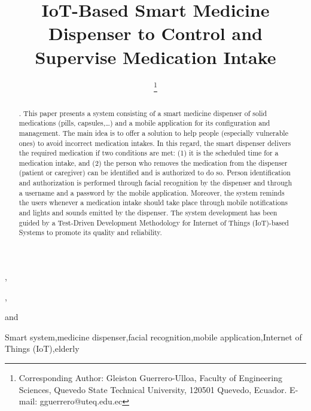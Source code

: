 \documentclass{IOS-Book-Article}
\begin{document}
\pagestyle{headings}
\def\thepage{}


\begin{frontmatter}              %


\title{IoT-Based Smart Medicine Dispenser to Control and Supervise Medication Intake\\}

\markboth{}{}

\author[A]{ %
\thanks{Corresponding Author: Gleiston Guerrero-Ulloa, Faculty of Engineering Sciences, Quevedo State Technical University, 120501 Quevedo, Ecuador. E-mail: gguerrero@uteq.edu.ec}},
\author[B]{ }
,
\author[B]{ }
and
\author[A]{ }

\address[A]{Faculty of Engineering Sciences, Quevedo State Technical University, Ecuador}
\address[B]{Software Engineering Department, University of Granada, Spain}

\begin{abstract}. This paper presents a system consisting of a smart medicine dispenser of solid medications (pills, capsules,…) and a mobile application for its configuration and management. The main idea is to offer a solution to help people (especially vulnerable ones) to avoid incorrect medication intakes. In this regard, the smart dispenser delivers the required medication if two conditions are met: (1) it is the scheduled time for a medication intake, and (2) the person who removes the medication from the dispenser (patient or caregiver) can be identified and is authorized to do so. Person identification and authorization is performed through facial recognition by the dispenser and through a username and a password by the mobile application. Moreover, the system reminds the users whenever a medication intake should take place through mobile notifications and lights and sounds emitted by the dispenser. The system development has been guided by a Test-Driven Development Methodology for Internet of Things (IoT)-based Systems to promote its quality and reliability.
	
\end{abstract}

\begin{keyword}
Smart system\sep medicine dispenser\sep facial recognition\sep mobile application\sep Internet of Things (IoT)\sep elderly


\end{keyword}
\end{frontmatter}
\markboth{}{}
\end{document}
